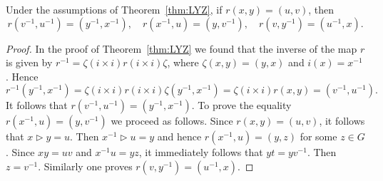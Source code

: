 \begin{proposition}
Under the assumptions of Theorem~\ref{thm:LYZ}, 
if $r(x,y)=(u,v)$, then 
\[
r(v^{-1},u^{-1})=(y^{-1},x^{-1}),
\quad
r(x^{-1},u)=(y,v^{-1}),
\quad
r(v,y^{-1})=(u^{-1},x).
\]
\end{proposition}

\begin{proof}
In the proof of Theorem~\ref{thm:LYZ} we found that 
the inverse of the map $r$ is given by $r^{-1}=\zeta (i\times i) r (i\times i) \zeta$,
where $\zeta(x,y)=(y,x)$ and $i(x)=x^{-1}$. Hence 
\[
r^{-1}(y^{-1},x^{-1})=\zeta (i\times i) r (i\times i) \zeta(y^{-1},x^{-1})=\zeta (i\times i) r (x,y)=(v^{-1},u^{-1}).
\]
It follows that $r(v^{-1},u^{-1})=(y^{-1},x^{-1})$.  
To prove the equality $r(x^{-1},u)=(y,v^{-1})$ we proceed as follows. Since $r(x,y)=(u,v)$, it 
follows that $x\triangleright y=u$. Then $x^{-1}\triangleright u=y$ and
hence $r(x^{-1},u)=(y,z)$ for some $z\in G$. 
Since $xy=uv$ and $x^{-1}u=yz$, it immediately follows that $yt=yv^{-1}$. Then 
$z=v^{-1}$. Similarly one proves $r(v,y^{-1})=(u^{-1},x)$.
\end{proof}
%
%

